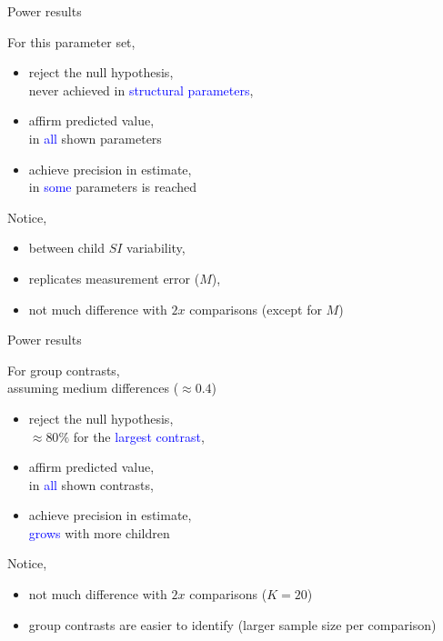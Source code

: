 %
%
\begin{lhframe}[rhgraphic={\texttt{[image: power\_result11.pdf]}}]
	{Power results} 
	
	For this parameter set,
	\begin{itemize}
		\item reject the null hypothesis, \\
		never achieved in \textcolor{blue}{structural parameters},
		\item affirm predicted value, \\
		in \textcolor{blue}{all} shown parameters
		\item achieve precision in estimate, \\
		in \textcolor{blue}{some} parameters is reached
	\end{itemize}
	
	Notice,
	\begin{itemize}
		\item between child $SI$ variability,
		\item replicates measurement error ($M$),
		\item not much difference with $2x$ comparisons {\small(except for $M$)}
	\end{itemize}
\end{lhframe}
%
%
\begin{lhframe}[rhgraphic={\texttt{[image: power\_result13.pdf]}}]
	{Power results} 
	
	For group contrasts, \\
	assuming medium differences ($\approx 0.4$)
	\begin{itemize}
		\item reject the null hypothesis, \\
		$\approx 80\%$ for the \textcolor{blue}{largest contrast},
		\item affirm predicted value, \\
		in \textcolor{blue}{all} shown contrasts,
		\item achieve precision in estimate, \\
		\textcolor{blue}{grows} with more children
	\end{itemize}
	
	Notice,
	\begin{itemize}
		\item not much difference with $2x$ comparisons ($K=20$)
		\item group contrasts are easier to identify {\small (larger sample size per comparison) }
	\end{itemize}
\end{lhframe}
